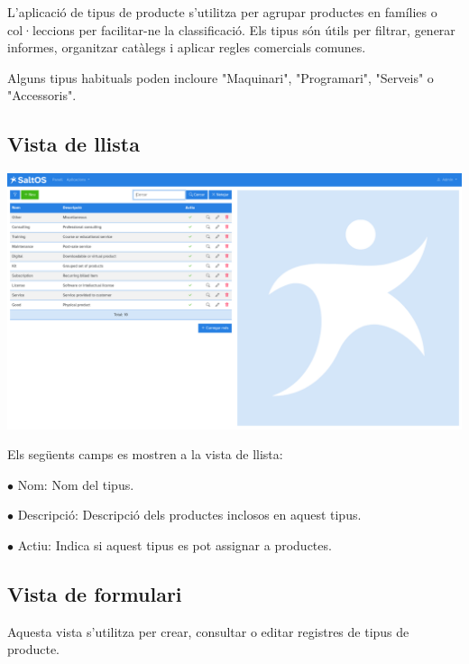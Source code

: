 \documentclass[a4paper]{article}
\begin{document}
L'aplicació de tipus de producte s'utilitza per agrupar productes en famílies o col·leccions per facilitar-ne la classificació.
Els tipus són útils per filtrar, generar informes, organitzar catàlegs i aplicar regles comercials comunes.

Alguns tipus habituals poden incloure "Maquinari", "Programari", "Serveis" o "Accessoris".

\hypertarget{toc163}{}
\subsection{Vista de llista}

\begin{center}\includegraphics[width=1\textwidth]{../ujest/snaps/test-screenshots-js-screenshots-sales-products-types-list-ca-es-1-snap.png}\end{center}

Els següents camps es mostren a la vista de llista:

\begin{compactitem}
\item[\color{myblue}$\bullet$] Nom: Nom del tipus.
\item[\color{myblue}$\bullet$] Descripció: Descripció dels productes inclosos en aquest tipus.
\item[\color{myblue}$\bullet$] Actiu: Indica si aquest tipus es pot assignar a productes.
\end{compactitem}

\hypertarget{toc164}{}
\subsection{Vista de formulari}

Aquesta vista s'utilitza per crear, consultar o editar registres de tipus de producte.
\end{document}
